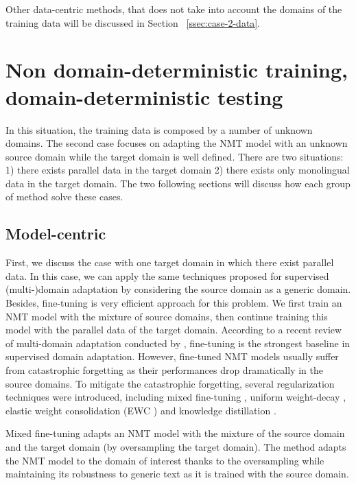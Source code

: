 Other data-centric methods, that does not take into account the domains of the training data will be discussed in Section ~\ref{ssec:case-2-data}.
\section{Non domain-deterministic training, domain-deterministic testing}
\label{sec:case2}
In this situation, the training data is composed by a number of unknown domains. The second case focuses on adapting the NMT model with an unknown source domain while the target domain is well defined. There are two situations: 1) there exists parallel data in the target domain 2) there exists only monolingual data in the target domain. The two following sections will discuss how each group of method solve these cases.
\subsection{Model-centric}
First, we discuss the case with one target domain in which there exist parallel data. In this case, we can apply the same techniques proposed for supervised (multi-)domain adaptation by considering the source domain as a generic domain. Besides, fine-tuning is very efficient approach for this problem\citep{Luong15stanford,Miceli17regularization,Servan16Domain,Freitag16fast}. We first train an NMT model with the mixture of source domains, then continue training this model with the parallel data of the target domain. According to a recent review of multi-domain adaptation conducted by \citet{Pham20Priming}, fine-tuning is the strongest baseline in supervised domain adaptation. However, fine-tuned NMT models usually suffer from catastrophic forgetting \citep{Michael89catastrophic} as their performances drop dramatically in the source domains. To mitigate the catastrophic forgetting, several regularization techniques were introduced, including mixed fine-tuning \citep{Chu17empirical}, uniform weight-decay \citep{Miceli17regularization}, elastic weight consolidation (EWC ) \citep{Brian19overcoming, Kirk16overcoming, Saunders19domain} and knowledge distillation \citep{Dakwle17fine}. 

Mixed fine-tuning \citep{Chu17empirical} adapts an NMT model with the mixture of the source domain and the target domain (by oversampling the target domain). The method adapts the NMT model to the domain of interest thanks to the oversampling while maintaining its robustness to generic text as it is trained with the source domain.

